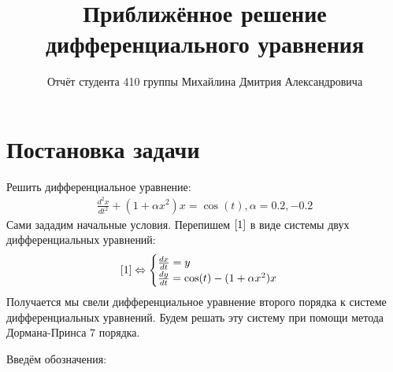 \documentclass[12pt, a4paper] {article}
\theoremstyle{remark}
\theoremstyle{definition}
\begin{document}
\newcommand{\address}{{
\bigskip
\footnotesize
\textsc{Московский государственный университет им. М.В. Ломоносова,
механико-математический факультет, Москва}\par\nopagebreak
}}


\title{Приближённое решение дифференциального уравнения}

\author{Отчёт студента 410 группы Михайлина Дмитрия Александровича} %


\maketitle

\section{Постановка задачи}
Решить дифференциальное уравнение:
\begin{gather}
	\label{1} \frac{d^2x}{dt^2} + (1 + \alpha x^2)x = \cos(t), 	 \alpha = 0.2, -0.2
\end{gather}
Сами зададим начальные условия.
Перепишем $\ref{1}$ в виде системы двух дифференциальных уравнений:
\begin{gather}
 \ref{1} \Leftrightarrow 
 \begin{cases}
 \frac{dx}{dt} = y \\
 \frac{dy}{dt} = \cos(t) - (1 + \alpha x^2)x
 \end{cases}
\end{gather}
Получается мы свели дифференциальное уравнение второго порядка к системе дифференциальных уравнений.
Будем решать эту систему при помощи метода Дормана-Принса 7 порядка.

Введём обозначения:
\end{document}
